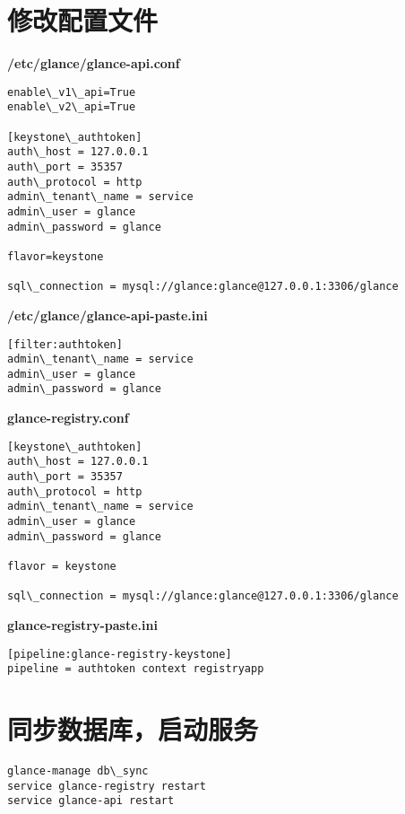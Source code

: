 \documentclass[a4paper,12pt,english]{sphinxmanual}
\begin{document}
\section{修改配置文件}
\label{glance:id3}
\textbf{/etc/glance/glance-api.conf}

\begin{Verbatim}[commandchars=\\\{\}]
enable\_v1\_api=True
enable\_v2\_api=True

[keystone\_authtoken]
auth\_host = 127.0.0.1
auth\_port = 35357
auth\_protocol = http
admin\_tenant\_name = service
admin\_user = glance
admin\_password = glance

flavor=keystone

sql\_connection = mysql://glance:glance@127.0.0.1:3306/glance
\end{Verbatim}

\textbf{/etc/glance/glance-api-paste.ini}

\begin{Verbatim}[commandchars=\\\{\}]
[filter:authtoken]
admin\_tenant\_name = service
admin\_user = glance
admin\_password = glance
\end{Verbatim}

\textbf{glance-registry.conf}

\begin{Verbatim}[commandchars=\\\{\}]
[keystone\_authtoken]
auth\_host = 127.0.0.1
auth\_port = 35357
auth\_protocol = http
admin\_tenant\_name = service
admin\_user = glance
admin\_password = glance

flavor = keystone

sql\_connection = mysql://glance:glance@127.0.0.1:3306/glance
\end{Verbatim}

\textbf{glance-registry-paste.ini}

\begin{Verbatim}[commandchars=\\\{\}]
[pipeline:glance-registry-keystone]
pipeline = authtoken context registryapp
\end{Verbatim}


\section{同步数据库，启动服务}
\label{glance:id4}
\begin{Verbatim}[commandchars=\\\{\}]
glance-manage db\_sync
service glance-registry restart
service glance-api restart
\end{Verbatim}
\end{document}
